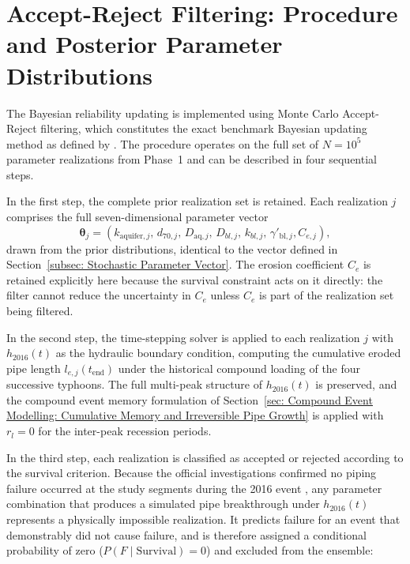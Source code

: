 \section{Accept-Reject Filtering: Procedure and Posterior Parameter Distributions}
\label{sec: Accept-Reject Filtering: Procedure and Posterior Parameter Distributions}

The Bayesian reliability updating is implemented using Monte Carlo Accept-Reject filtering, which constitutes the exact benchmark Bayesian updating method as defined by \textcite{schweckendiek_2014}. The procedure operates on the full set of $N = 10^5$ parameter realizations from Phase~1 and can be described in four sequential steps.

In the first step, the complete prior realization set is retained. Each realization $j$ comprises the full seven-dimensional parameter vector
\[
\boldsymbol{\theta}_j =
\left(
k_{\mathrm{aquifer},j},\,
d_{70,j},\,
D_{\mathrm{aq},j},\,
D_{bl,j},\,
k_{bl,j},\,
\gamma'_{\mathrm{bl},j},
C_{e,j}
\right),
\]
drawn from the prior distributions, identical to the vector defined in Section~\ref{subsec: Stochastic Parameter Vector}. The erosion coefficient $C_e$ is retained explicitly here because the survival constraint acts on it directly: the filter cannot reduce the uncertainty in $C_e$ unless $C_e$ is part of the realization set being filtered.

In the second step, the time-stepping solver is applied to each realization $j$ with $h_{2016}(t)$ as the hydraulic boundary condition, computing the cumulative eroded pipe length $l_{e,j}(t_\mathrm{end})$ under the historical compound loading of the four successive typhoons. The full multi-peak structure of $h_{2016}(t)$ is preserved, and the compound event memory formulation of Section~\ref{sec: Compound Event Modelling: Cumulative Memory and Irreversible Pipe Growth} is applied with $r_l = 0$ for the inter-peak recession periods.

In the third step, each realization is classified as accepted or rejected according to the survival criterion. Because the official investigations confirmed no piping failure occurred at the study segments during the 2016 event \parencite{tokachi_levee_committee_2017}, any parameter combination that produces a simulated pipe breakthrough under $h_{2016}(t)$ represents a physically impossible realization. It predicts failure for an event that demonstrably did not cause failure, and is therefore assigned a conditional probability of zero ($P(F \mid \text{Survival}) = 0$) and excluded from the ensemble:

